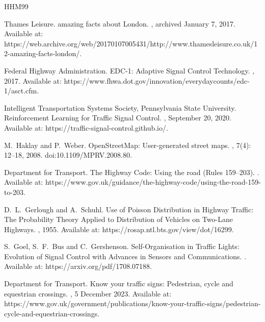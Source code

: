 \documentclass[a4paper]{report}
\begin{document}
\begin{thebibliography}{HHM99}

Thames Leisure.
 amazing facts about London.
, archived January 7, 2017.
\newblock Available at:
  https://web.archive.org/web/20170107005431/http://www.thamesleisure.co.uk/12-amazing-facts-london/.

Federal Highway Administration.
\newblock EDC-1: Adaptive Signal Control Technology.
, 2017.
\newblock Available at:
  https://www.fhwa.dot.gov/innovation/everydaycounts/edc-1/asct.cfm.

Intelligent Transportation Systems Society, Pennsylvania State University.
\newblock Reinforcement Learning for Traffic Signal Control.
, September 20, 2020.
\newblock Available at:
  https://traffic-signal-control.github.io/.

M.~Haklay and P.~Weber.
\newblock OpenStreetMap: User-generated street maps.
, 7(4): 12--18, 2008.
\newblock doi:10.1109/MPRV.2008.80.

Department for Transport.
\newblock The Highway Code: Using the road (Rules 159--203).
.
\newblock Available at:
  https://www.gov.uk/guidance/the-highway-code/using-the-road-159-to-203.

D.~L.~Gerlough and A.~Schuhl.
\newblock Use of Poisson Distribution in Highway Traffic: The Probability Theory Applied to Distribution of Vehicles on Two-Lane Highways.
, 1955.
\newblock Available at:
  https://rosap.ntl.bts.gov/view/dot/16299.

S.~Goel, S.~F.~Bus and C.~Gershenson.
\newblock Self-Organisation in Traffic Lights: Evolution of Signal Control with Advances in Sensors and Communications.
.
\newblock Available at:
  https://arxiv.org/pdf/1708.07188.

Department for Transport.
\newblock Know your traffic signs: Pedestrian, cycle and equestrian crossings.
, 5 December 2023.
\newblock Available at:
  https://www.gov.uk/government/publications/know-your-traffic-signs/pedestrian-cycle-and-equestrian-crossings.


\end{thebibliography}
\end{document}
